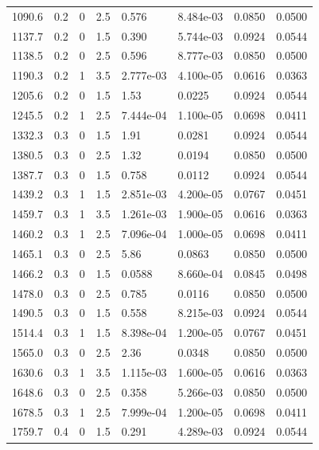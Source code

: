 \documentclass[preview]{standalone}
\begin{document}
{{{\begin{tabular}{L{1.2cm}C{1.2cm} C{0.3cm}C{0.5cm} C{1.4cm}C{1.4cm} C{1.4cm}C{1.4cm}}
  1090.6  &   0.2  & 0     & 2.5 &  0.576  & 8.484e-03  & 0.0850 &  0.0500   \\ 
  1137.7  &   0.2  & 0     & 1.5 &  0.390  & 5.744e-03  & 0.0924 &  0.0544   \\ 
  1138.5  &   0.2  & 0     & 2.5 &  0.596  & 8.777e-03  & 0.0850 &  0.0500   \\ 
  1190.3  &   0.2  & 1     & 3.5 &  2.777e-03  & 4.100e-05  & 0.0616 &  0.0363   \\ 
  1205.6  &   0.2  & 0     & 1.5 &  1.53  & 0.0225  & 0.0924 &  0.0544   \\ 
  1245.5  &   0.2  & 1     & 2.5 &  7.444e-04  & 1.100e-05  & 0.0698 &  0.0411   \\ 
  1332.3  &   0.3  & 0     & 1.5 &  1.91  & 0.0281  & 0.0924 &  0.0544   \\ 
  1380.5  &   0.3  & 0     & 2.5 &  1.32  & 0.0194  & 0.0850 &  0.0500   \\ 
  1387.7  &   0.3  & 0     & 1.5 &  0.758  & 0.0112  & 0.0924 &  0.0544   \\ 
  1439.2  &   0.3  & 1     & 1.5 &  2.851e-03  & 4.200e-05  & 0.0767 &  0.0451   \\ 
  1459.7  &   0.3  & 1     & 3.5 &  1.261e-03  & 1.900e-05  & 0.0616 &  0.0363   \\ 
  1460.2  &   0.3  & 1     & 2.5 &  7.096e-04  & 1.000e-05  & 0.0698 &  0.0411   \\ 
  1465.1  &   0.3  & 0     & 2.5 &  5.86  & 0.0863  & 0.0850 &  0.0500   \\ 
  1466.2  &   0.3  & 0     & 1.5 &  0.0588  & 8.660e-04  & 0.0845 &  0.0498   \\ 
  1478.0  &   0.3  & 0     & 2.5 &  0.785  & 0.0116  & 0.0850 &  0.0500   \\ 
  1490.5  &   0.3  & 0     & 1.5 &  0.558  & 8.215e-03  & 0.0924 &  0.0544   \\ 
  1514.4  &   0.3  & 1     & 1.5 &  8.398e-04  & 1.200e-05  & 0.0767 &  0.0451   \\ 
  1565.0  &   0.3  & 0     & 2.5 &  2.36  & 0.0348  & 0.0850 &  0.0500   \\ 
  1630.6  &   0.3  & 1     & 3.5 &  1.115e-03  & 1.600e-05  & 0.0616 &  0.0363   \\ 
  1648.6  &   0.3  & 0     & 2.5 &  0.358  & 5.266e-03  & 0.0850 &  0.0500   \\ 
  1678.5  &   0.3  & 1     & 2.5 &  7.999e-04  & 1.200e-05  & 0.0698 &  0.0411   \\ 
  1759.7  &   0.4  & 0     & 1.5 &  0.291  & 4.289e-03  & 0.0924 &  0.0544   \\ 

\end{tabular}}}}
\end{document}
